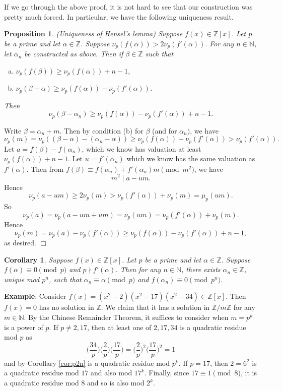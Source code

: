 \documentclass{article}
\def\Z{{\mathbb Z}}
\def\N{{\mathbb N}}
\def\Z{{\mathbb Z}}
\newtheorem{cor}[subsection]{Corollary}
\newtheorem{proposition}[subsection]{Proposition}
\newenvironment{proof}{\noindent {\bf Proof:}}{$\Box$ \vspace{2 ex}}
\renewcommand{\lg}[2]{\Big(\frac{#1}{#2}\Big)}
\begin{document}
If we go through the above proof, it is not hard to see that our construction was pretty much forced. In particular, we have the following uniqueness result.

\begin{proposition}
    (Uniqueness of Hensel's lemma) Suppose $f(x)\in\Z[x]$. Let $p$ be a prime and let $\alpha\in \Z$. Suppose $\nu_p(f(\alpha)) > 2\nu_p(f'(\alpha)).$ For any $n\in\N$, let $\alpha_n$ be constructed as above. Then if $\beta\in\Z$ such that
    \begin{enumerate}[(a)]
        \item $\nu_p(f(\beta)) \geq \nu_p(f(\alpha)) + n-1$,
        \item $\nu_p(\beta-\alpha) \geq \nu_p(f(\alpha))-\nu_p(f'(\alpha))$.
    \end{enumerate} 
    Then $$\nu_p(\beta-\alpha_n)\geq \nu_p(f(\alpha)) - \nu_p(f'(\alpha)) + n - 1.$$
\end{proposition}

\begin{proof}
    Write $\beta = \alpha_n + m$. Then by condition (b) for $\beta$ (and for $\alpha_n)$, we have
    $$\nu_p(m)  = \nu_p((\beta-\alpha)-(\alpha_n-\alpha))\geq \nu_p(f(\alpha)) - \nu_p(f'(\alpha)) > \nu_p(f'(\alpha)).$$ %
Let $a = f(\beta) - f(\alpha_n)$, which we know has valuation at least $\nu_p(f(\alpha)) + n-1$. Let $u = f'(\alpha_n)$ which we know has the same valuation as $f'(\alpha)$. Then from $f(\beta) \equiv f(\alpha_n) + f'(\alpha_n)m \pmod{m^2}$, we have $$m^2\mid a - um.$$
Hence $$\nu_p(a - um) \geq 2\nu_p(m) > \nu_p(f'(\alpha)) + \nu_p(m) = \mu_p(um).$$ So
$$\nu_p(a) = \nu_p(a - um + um) = \nu_p(um) = \nu_p(f'(\alpha)) + \nu_p(m).$$
Hence
$$\nu_p(m) = \nu_p(a) - \nu_p(f'(\alpha)) \geq \nu_p(f(\alpha)) - \nu_p(f'(\alpha)) + n - 1,$$
as desired.
\end{proof}

\begin{cor}
    Suppose $f(x)\in\Z[x]$. Let $p$ be a prime and let $\alpha\in \Z$. Suppose $f(\alpha)\equiv 0\pmod{p}$ and $p\nmid f'(\alpha)$. Then for any $n\in\N$, there exists $\alpha_n\in\Z$, unique mod $p^n$, such that $\alpha_n\equiv \alpha\pmod{p}$ and $f(\alpha_n)\equiv 0\pmod{p^n}.$
\end{cor}

\vspace{5pt}
\noindent\textbf{Example}: Consider $f(x) = (x^2 - 2)(x^2 - 17)(x^2 - 34)\in\Z[x]$. Then $f(x) = 0$ has no solution in $\Z$. We claim that it has a solution in $\Z/m\Z$ for any $m\in\N$. By the Chinese Remainder Theorem, it suffices to consider when $m = p^k$ is a power of $p$. If $p\neq 2,17$, then at least one of $2, 17, 34$ is a quadratic residue mod $p$ as
$$\lg{34}{p}\lg{2}{p}\lg{17}{p} = \lg{2}{p}^2\lg{17}{p}^2 = 1$$
and by Corollary \ref{cor:p2n} is a quadratic residue mod $p^k$. If $p = 17$, then $2 = 6^2$ is a quadratic residue mod $17$ and also mod $17^k$. Finally, since $17\equiv 1\pmod{8}$, it is a quadratic residue mod $8$ and so is also mod $2^k$.
\end{document}
